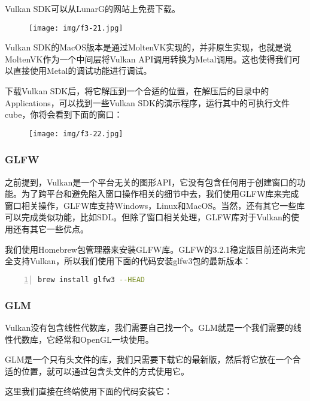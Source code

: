 \documentclass{ctexart}
\begin{document}
Vulkan SDK可以从LunarG的网站上免费下载。

\begin{figure}[H]
	\centering
	\texttt{[image: img/f3-21.jpg]}
\end{figure}

Vulkan SDK的MacOS版本是通过MoltenVK实现的，并非原生实现，也就是说MoltenVK作为一个中间层将Vulkan API调用转换为Metal调用。这也使得我们可以直接使用Metal的调试功能进行调试。

下载Vulkan SDK后，将它解压到一个合适的位置，在解压后的目录中的Applications，可以找到一些Vulkan SDK的演示程序，运行其中的可执行文件cube，你将会看到下面的窗口：

\begin{figure}[H]
	\centering
	\texttt{[image: img/f3-22.jpg]}
\end{figure}

\subsubsection{GLFW}

之前提到，Vulkan是一个平台无关的图形API，它没有包含任何用于创建窗口的功能。为了跨平台和避免陷入窗口操作相关的细节中去，我们使用GLFW库来完成窗口相关操作，GLFW库支持Windows，Linux和MacOS。当然，还有其它一些库可以完成类似功能，比如SDL。但除了窗口相关处理，GLFW库对于Vulkan的使用还有其它一些优点。

我们使用Homebrew包管理器来安装GLFW库。GLFW的3.2.1稳定版目前还尚未完全支持Vulkan，所以我们使用下面的代码安装glfw3包的最新版本：

\begin{lstlisting}[language={bash},keywordstyle=\color{blue!70},commentstyle=\color{red!50!green!50!blue!50},frame=shadowbox, rulesepcolor=\color{red!20!green!20!blue!20},basicstyle=\small,numbers=left, numberstyle=\tiny,breaklines=true]
brew install glfw3 --HEAD
\end{lstlisting}

\subsubsection{GLM}

Vulkan没有包含线性代数库，我们需要自己找一个。GLM就是一个我们需要的线性代数库，它经常和OpenGL一块使用。

GLM是一个只有头文件的库，我们只需要下载它的最新版，然后将它放在一个合适的位置，就可以通过包含头文件的方式使用它。

这里我们直接在终端使用下面的代码安装它：
\end{document}
